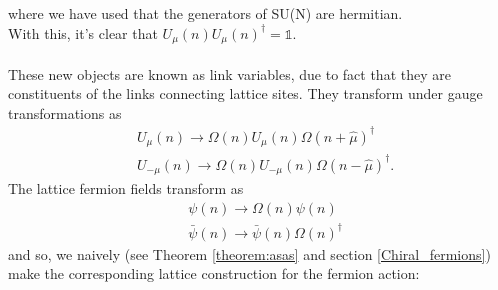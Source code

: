 \documentclass[a4paper,10pt]{article}
\begin{document}
where we have used that the generators of SU(N) are hermitian.\\With this, it's clear that $U_{\mu}(n)U_{\mu}(n)^\dagger = \mathbb{1}$.\\\\
These new objects are known as link variables, due to fact that they are constituents of the links connecting lattice sites. They transform under gauge transformations as 
\begin{equation}\label{eq:linkVariables_transforming}
\begin{aligned}
&U_{\mu}(n) \rightarrow \Omega(n) U_{\mu}(n) \Omega(n+\hat{\mu})^{\dagger}\\
&U_{-\mu}(n) \rightarrow \Omega(n) U_{-\mu}(n) \Omega(n-\hat{\mu})^{\dagger}.
\end{aligned}
\end{equation}
The lattice fermion fields transform as 
\begin{equation}
\begin{aligned}
&\psi(n) \rightarrow \Omega(n) \psi(n)\\ &\bar{\psi}(n) \rightarrow \bar{\psi}(n) \Omega(n)^{\dagger}
\end{aligned}
\end{equation}
and so, we naively (see Theorem \ref{theorem:asas} and section \ref{Chiral_fermions}) make the corresponding lattice construction for the fermion action:
\end{document}
